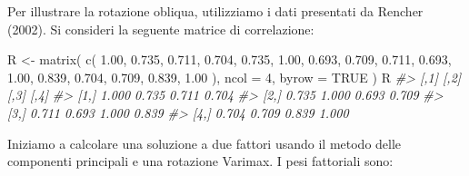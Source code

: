 \documentclass[
  11pt,
]{krantz}
\makeatletter
\newenvironment{Shaded}{\begin{snugshade}}{\end{snugshade}}
\newcommand{\AttributeTok}[1]{\textcolor[rgb]{0.61,0.61,0.61}{#1}}
\newcommand{\CommentTok}[1]{\textcolor[rgb]{0.37,0.37,0.37}{\textit{#1}}}
\newcommand{\ConstantTok}[1]{\textcolor[rgb]{0,0,0}{#1}}
\newcommand{\DecValTok}[1]{\textcolor[rgb]{0.06,0.06,0.06}{#1}}
\newcommand{\FloatTok}[1]{\textcolor[rgb]{0.06,0.06,0.06}{#1}}
\newcommand{\FunctionTok}[1]{\textcolor[rgb]{0,0,0}{#1}}
\newcommand{\NormalTok}[1]{#1}
\newcommand{\OtherTok}[1]{\textcolor[rgb]{0.37,0.37,0.37}{#1}}
\newenvironment{kframe}{%
\medskip{}
\setlength{\fboxsep}{.8em}
 \def\at@end@of@kframe{}%
 \ifinner\ifhmode%
  \def\at@end@of@kframe{\end{minipage}}%
  \begin{minipage}{\columnwidth}%
 \fi\fi%
 \def\FrameCommand##1{\hskip\@totalleftmargin \hskip-\fboxsep
 \colorbox{shadecolor}{##1}\hskip-\fboxsep
     \hskip-\linewidth \hskip-\@totalleftmargin \hskip\columnwidth}%
 \MakeFramed {\advance\hsize-\width
   \@totalleftmargin\z@ \linewidth\hsize
   \@setminipage}}%
 {\par\unskip\endMakeFramed%
 \at@end@of@kframe}
\renewenvironment{Shaded}{\begin{kframe}}{\end{kframe}}
\theoremstyle{definition}
\theoremstyle{definition}
\theoremstyle{definition}
\theoremstyle{definition}
\theoremstyle{remark}
\makeatother
\begin{document}
Per illustrare la rotazione obliqua, utilizziamo i dati presentati da Rencher (2002). Si consideri la seguente matrice di correlazione:

\begin{Shaded}
\begin{Highlighting}[]
\NormalTok{R }\OtherTok{\textless{}{-}} \FunctionTok{matrix}\NormalTok{(}
  \FunctionTok{c}\NormalTok{(}
    \FloatTok{1.00}\NormalTok{, }\FloatTok{0.735}\NormalTok{, }\FloatTok{0.711}\NormalTok{, }\FloatTok{0.704}\NormalTok{,}
    \FloatTok{0.735}\NormalTok{, }\FloatTok{1.00}\NormalTok{, }\FloatTok{0.693}\NormalTok{, }\FloatTok{0.709}\NormalTok{,}
    \FloatTok{0.711}\NormalTok{, }\FloatTok{0.693}\NormalTok{, }\FloatTok{1.00}\NormalTok{, }\FloatTok{0.839}\NormalTok{,}
    \FloatTok{0.704}\NormalTok{, }\FloatTok{0.709}\NormalTok{, }\FloatTok{0.839}\NormalTok{, }\FloatTok{1.00}
\NormalTok{  ),}
  \AttributeTok{ncol =} \DecValTok{4}\NormalTok{,}
  \AttributeTok{byrow =} \ConstantTok{TRUE}
\NormalTok{)}
\NormalTok{R}
\CommentTok{\#\textgreater{}       [,1]  [,2]  [,3]  [,4]}
\CommentTok{\#\textgreater{} [1,] 1.000 0.735 0.711 0.704}
\CommentTok{\#\textgreater{} [2,] 0.735 1.000 0.693 0.709}
\CommentTok{\#\textgreater{} [3,] 0.711 0.693 1.000 0.839}
\CommentTok{\#\textgreater{} [4,] 0.704 0.709 0.839 1.000}
\end{Highlighting}
\end{Shaded}

Iniziamo a calcolare una soluzione a due fattori usando il metodo delle componenti principali e una rotazione Varimax. I pesi fattoriali sono:
\end{document}
